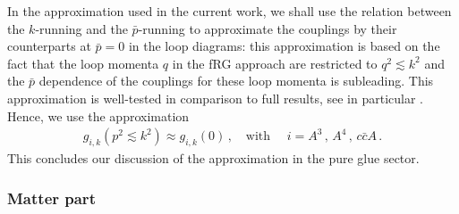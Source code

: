 \documentclass[aps,twocolumn,prd,superscriptaddress]{revtex4-2}
\begin{document}
In the approximation used in the current work, we shall use the relation between the $k$-running and the $\bar p$-running to approximate the couplings  by their counterparts at $\bar p=0$ in the loop diagrams: this approximation is based on the fact that the loop momenta $q$ in the fRG approach are restricted to $ q^2 \lesssim k^2$ and the $\bar p$ dependence of the couplings for these loop momenta is subleading. 
This approximation is well-tested in comparison to full results, see in particular \cite{Mitter:2014wpa, Cyrol:2016tym,Cyrol:2017ewj}. Hence, we use the approximation
%
\begin{align}
g_{i,k}(p^2\lesssim k^2) \approx g_{i,k}(0)\,, \quad \textrm{with }\quad i=A^3\,,\,A^4\,,\,c\bar cA\,.
\label{eq:Localg}
\end{align}
%
This concludes our discussion of the approximation in the pure glue sector.


\subsubsection{Matter part} 
\label{sec:Matter}
\end{document}
